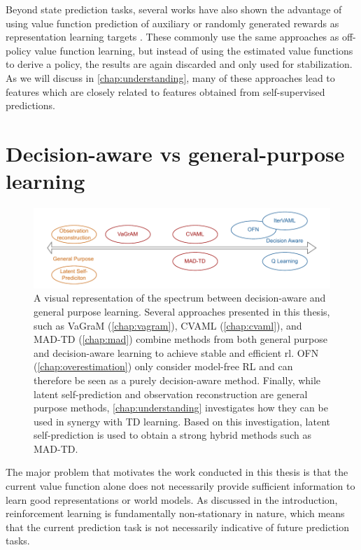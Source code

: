 Beyond state prediction tasks, several works have also shown the advantage of using value function prediction of auxiliary or randomly generated rewards as representation learning targets \parencite{lyle2021effect,farebrother2023protovalue}.
These commonly use the same approaches as off-policy value function learning, but instead of using the estimated value functions to derive a policy, the results are again discarded and only used for stabilization.
As we will discuss in \autoref{chap:understanding}, many of these approaches lead to features which are closely related to features obtained from self-supervised predictions.

\section{Decision-aware vs general-purpose learning}
\begin{figure}[t]
    \includegraphics{illustrations/thesis_daml_spectrum.pdf}    
    \caption{A visual representation of the spectrum between decision-aware and general purpose learning.
    Several approaches presented in this thesis, such as VaGraM (\autoref{chap:vagram}), CVAML (\autoref{chap:cvaml}), and MAD-TD (\autoref{chap:mad}) combine methods from both general purpose and decision-aware learning to achieve stable and efficient \ac{rl}.
    OFN (\autoref{chap:overestimation}) only consider model-free RL and can therefore be seen as a purely decision-aware method.
    Finally, while latent self-prediction and observation reconstruction are general purpose methods, \autoref{chap:understanding} investigates how they can be used in synergy with TD learning.
    Based on this investigation, latent self-prediction is used to obtain a strong hybrid methods such as MAD-TD.}
    \label{fig:background:spectrum}
\end{figure}

The major problem that motivates the work conducted in this thesis is that the current value function alone does not necessarily provide sufficient information to learn good representations or world models.
As discussed in the introduction, reinforcement learning is fundamentally non-stationary in nature, which means that the current prediction task is not necessarily indicative of future prediction tasks.

